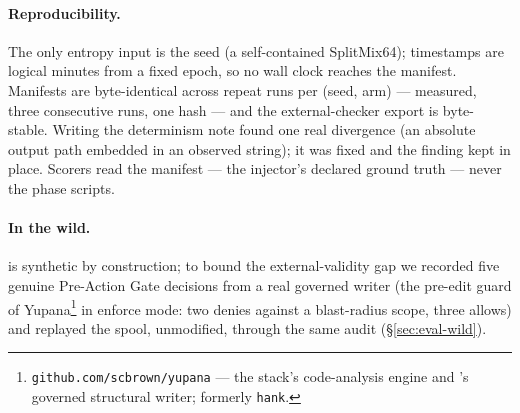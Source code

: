 \paragraph{Reproducibility.}
The only entropy input is the seed (a self-contained SplitMix64);
timestamps are logical minutes from a fixed epoch, so no wall clock
reaches the manifest. Manifests are byte-identical across repeat runs
per (seed, arm) --- measured, three consecutive runs, one hash --- and the
external-checker export is byte-stable. Writing the determinism note
found one real divergence (an absolute output path embedded in an
observed string); it was fixed and the finding kept in place. Scorers
read the manifest --- the injector's declared ground truth --- never the
phase scripts.

\paragraph{In the wild.}
\census is synthetic by construction; to bound the external-validity
gap we recorded five genuine Pre-Action Gate decisions from a real
governed writer (the pre-edit guard of Yupana\footnote{\texttt{github.com/scbrown/yupana} --- the stack's
code-analysis engine and \sys's governed structural writer; formerly
\texttt{hank}.} in enforce mode: two denies
against a blast-radius scope, three allows) and replayed the spool,
unmodified, through the same audit (\S\ref{sec:eval-wild}).
